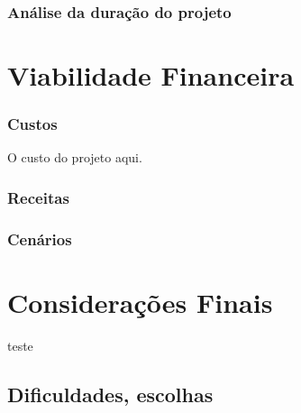 \documentclass[
	12pt,				%
	openright,			%
	twoside,			%
	a4paper,			%
	english,			%
	french,				%
	spanish,			%
	brazil				%
	]{abntex2}
\begin{document}
\subsection{Análise da duração do projeto}

\chapter{Viabilidade Financeira}

\subsection{Custos}
O custo do projeto aqui.

\subsection{Receitas}

\subsection{Cenários}



\chapter{Considerações Finais}
teste

\section{Dificuldades, escolhas}




\lipsum[24]





\postextual



\end{document}
